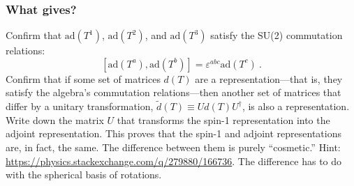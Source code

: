 \documentclass[12pt]{article}
\numberwithin{equation}{subsection}    %
\renewcommand{\tilde}{\widetilde}   %
\begin{document}
\subsubsection{What gives?}

Confirm that $\text{ad}(T^1)$, $\text{ad}(T^2)$, and $\text{ad}(T^3)$ satisfy the SU(2) commutation relations: $$[\text{ad}(T^a), \text{ad}(T^b)] = \varepsilon^{abc}\text{ad}(T^c) \ .$$
Confirm that if some set of matrices $d(T)$ are a representation---that is, they satisfy the algebra's commutation relations---then another set of matrices that differ by a unitary transformation, $\tilde d(T) \equiv U d(T) U^\dag$, is also a representation. Write down the matrix $U$ that transforms the spin-1 representation into the adjoint representation. This proves that the spin-1 and adjoint representations are, in fact, the same. The difference between them is purely ``cosmetic.'' Hint: \url{https://physics.stackexchange.com/q/279880/166736}. The difference has to do with the spherical basis of rotations.
\end{document}

